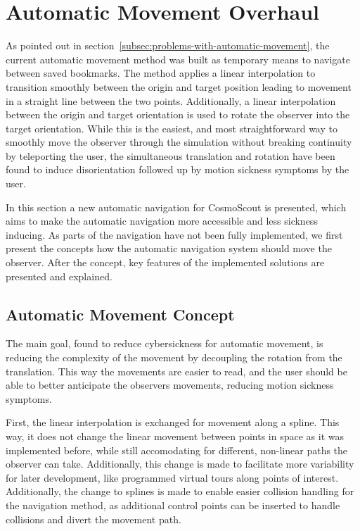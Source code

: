 \section{Automatic Movement Overhaul}\label{sec:automatic-movement-overhaul}

As pointed out in section~\ref{subsec:problems-with-automatic-movement}, the current automatic movement method was
built as temporary means to navigate between saved bookmarks.
The method applies a linear interpolation to transition smoothly between the origin and target position leading to
movement in a straight line between the two points.
Additionally, a linear interpolation between the origin and target orientation is used to rotate the observer into the
target orientation.
While this is the easiest, and most straightforward way to smoothly move the observer through the simulation without
breaking continuity by teleporting the user, the simultaneous translation and rotation have been found to induce
disorientation followed up by motion sickness symptoms by the user.

In this section a new automatic navigation for CosmoScout is presented, which aims to make the automatic navigation
more accessible and less sickness inducing.
As parts of the navigation have not been fully implemented, we first present the concepts how the automatic
navigation system should move the observer.
After the concept, key features of the implemented solutions are presented and explained.


\subsection{Automatic Movement Concept}\label{subsec:automatic-movement-concept}

The main goal, found to reduce cybersickness for automatic movement, is reducing the complexity of the movement by
decoupling the rotation from the translation.
This way the movements are easier to read, and the user should be able to better anticipate the observers movements,
reducing motion sickness symptoms.

First, the linear interpolation is exchanged for movement along a spline.
This way, it does not change the linear movement between points in space as it was implemented before, while still
accomodating for different, non-linear paths the observer can take.
Additionally, this change is made to facilitate more variability for later development, like programmed virtual tours
along points of interest.
Additionally, the change to splines is made to enable easier collision handling for the navigation method, as
additional control points can be inserted to handle collisions and divert the movement path.

